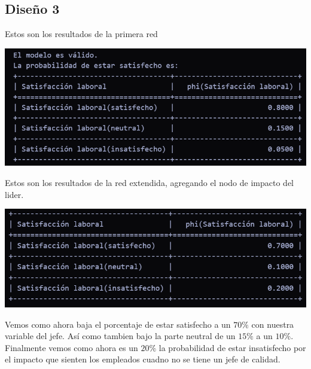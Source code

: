 \subsection{Diseño 3}

Estos son los resultados de la primera red 
\begin{center}
    \includegraphics[scale = .6]{IMA/ejecucionRedBayesina.png}
\end{center}

Estos son los resultados de la red extendida, agregando el nodo de impacto del lider.

\begin{center}
    \includegraphics[scale = .6]{IMA/ejecucionRedExtension.png}
\end{center}

Vemos como ahora baja el porcentaje de estar satisfecho a un $70\%$ con nuestra 
variable del jefe. Así como tambien bajo la parte neutral de un $15\%$ a un 
$10\%$. Finalmente vemos como ahora es un $20\%$ la probabilidad de estar 
insatisfecho por el impacto que sienten los empleados cuadno no se tiene 
un jefe de calidad. 